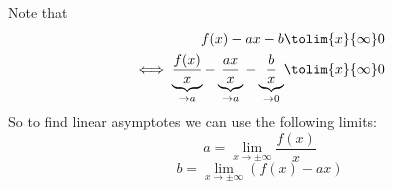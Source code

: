 \begin{rem}\label{rem-asymptotes}
	Note that
	\begin{align*}
		f(x)-ax-b                                                                                              & \tolim{x}{\infty}0 \\
		\iff
		\underbrace{\frac{f(x)}{x}}_{\to a}-\underbrace{\frac{ax}{x}}_{\to a}-\underbrace{\frac{b}{x}}_{\to 0} & \tolim{x}{\infty}0
	\end{align*}
	So to find linear asymptotes we can use the following limits:
	\begin{equation}\label{rem-asymptotes:a}
		a = \lim_{x \to \pm\infty}\frac{f(x)}{x}
	\end{equation}
	\begin{equation}\label{rem-asymptotes:b}
		b = \lim_{x \to \pm\infty}\left(f(x)-ax\right)
	\end{equation}
\end{rem}

